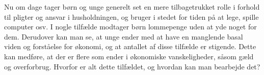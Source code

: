 Nu om dage tager børn og unge generelt set en mere tilbagetrukket rolle i forhold til pligter og ansvar i husholdningen, og bruger i stedet for tiden på at lege, spille computer osv\cite{Boerneliv}. I nogle tilfælde modtager børn lommepenge uden at yde noget for dem. Derudover kan man se, at unge ender med at have en manglende basal viden og forståelse for økonomi, og at antallet af disse tilfælde er stigende\cite{BusinessDK2}. Dette kan medføre, at der er flere som ender i økonomiske vanskeligheder, såsom gæld og overforbrug. Hvorfor er alt dette tilfældet, og hvordan kan man bearbejde det?
